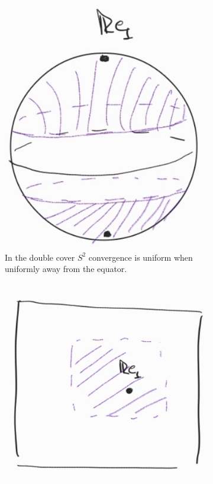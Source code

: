 \documentclass{report}
\begin{document}
\begin{figure}[ht]
    \centering
    \begin{subfigure}[b]{0.45\textwidth}
        \includegraphics[width=\textwidth]{jordan_dynamics3}
        \caption{In the double cover $S^2$ convergence is uniform when uniformly away from the equator.}
        \label{fig:jordan_dynamics_sphere}
    \end{subfigure}
    \hfill
    \begin{subfigure}[b]{0.45\textwidth}
        \includegraphics[width=\textwidth]{jordan_dynamics2}

\end{subfigure}
\end{figure}
\end{document}
